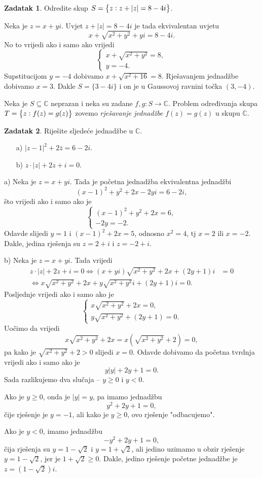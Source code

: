 \documentclass{book}
\let\originalleft\left
\let\originalright\right
\renewcommand{\left}{\mathopen{}\mathclose\bgroup\originalleft}
\renewcommand{\right}{\aftergroup\egroup\originalright}
\renewenvironment{proof}{%
    \vspace{-\parskip}\begin{oldproof}%
    }{%
    \end{oldproof}%
}
\theoremstyle{definition}
\theoremstyle{definition}
\newtheorem{exercise}{Zadatak}
\theoremstyle{remark}
\begin{document}
\begin{exercise}
Odredite skup $S=\left\{z : z+|z|=8-4i\right\}$.
\end{exercise}
\begin{proof}[Rješenje]
Neka je $z=x+yi$. Uvjet $z+|z|=8-4i$ je tada ekvivalentan uvjetu
$$x+\sqrt{x^2+y^2}+yi=8-4i.$$ No to vrijedi ako i samo ako vrijedi
$$\begin{cases}
x+\sqrt{x^2+y^2}=8,\\
y=-4.
\end{cases}$$
Supstitucijom $y=-4$ dobivamo $x+\sqrt{x^2+16}=8$. Rješavanjem jednadžbe dobivamo $x=3$. Dakle $S=\{3-4i\}$ i on je u Gaussovoj ravnini točka $(3, -4)$.
\end{proof}
Neka je $S\subseteq \mathbb{C}$ neprazan i neka su zadane $f, g : S\to \mathbb{C}$. Problem određivanja skupa $T=\left\{z : f(z)=g(z)\right\}$ zovemo \textit{rješavanje jednadžbe} $f(z)=g(z)$ u skupu $\mathbb{C}$.
\begin{exercise} Riješite sljedeće jednadžbe u $\mathbb{C}$.
\begin{itemize}
\item[a)] $|z-1|^2+2\overline{z}=6-2i$.
\item[b)] $z\cdot |z|+2z+i=0.$
\end{itemize}
\end{exercise}
\begin{proof}[Rješenje]
a) Neka je $z=x+yi$. Tada je početna jednadžba ekvivalentna jednadžbi $$(x-1)^2+y^2+2x-2yi=6-2i,$$
što vrijedi ako i samo ako je
$$\begin{cases}
(x-1)^2+y^2+2x=6,\\
-2y=-2.
\end{cases}$$
Odavde slijedi $y=1$ i $(x-1)^2+2x=5$, odnosno $x^2=4$, tj $x=2$ ili $x=-2$. Dakle, jedina rješenja su $z=2+i$ i $z=-2+i$.

b) Neka je $z=x+yi$. Tada vrijedi
\begin{align*}
z\cdot |z|+2z+i=0\Leftrightarrow (x+yi)\sqrt{x^2+y^2}+2x+(2y+1)i&=0\\
\Leftrightarrow x\sqrt{x^2+y^2}+2x+y\sqrt{x^2+y^2}i+(2y+1)i=0.
\end{align*}
Posljednje vrijedi ako i samo ako je
$$\begin{cases}
x\sqrt{x^2+y^2}+2x=0,\\
y\sqrt{x^2+y^2}+(2y+1)=0.
\end{cases}$$
Uočimo da vrijedi $$x\sqrt{x^2+y^2}+2x=x(\sqrt{x^2+y^2}+2)=0,$$ pa kako je $\sqrt{x^2+y^2}+2>0$ slijedi $x=0$. Odavde dobivamo da početna tvrdnja vrijedi ako i samo ako je 
$$y|y|+2y+1=0.$$ Sada razlikujemo dva slučaja -- $y\geq 0$ i $y<0$.

Ako je $y\geq 0$, onda je $|y|=y$, pa imamo jednadžbu $$y^2+2y+1=0,$$ čije rješenje je $y=-1$, ali kako je $y\geq 0$, ovo rješenje "odbacujemo". 

Ako je $y<0$, imamo jednadžbu $$-y^2+2y+1=0,$$ čija rješenja su $y=1-\sqrt{2}$ i $y=1+\sqrt{2}$, ali jedino uzimamo u obzir rješenje $y=1-\sqrt{2}$, jer je $1+\sqrt{2}\geq 0$. Dakle, jedino rješenje početne jednadžbe je $z=(1-\sqrt{2})i$.
\end{proof}
\end{document}
